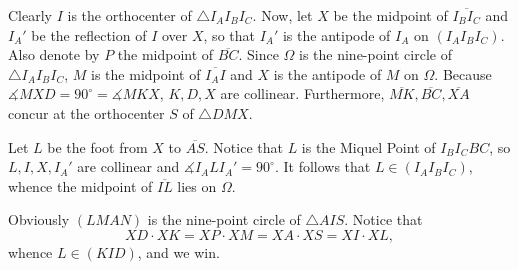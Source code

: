 Clearly $I$ is the orthocenter of $\triangle I_AI_BI_C$. Now, let $X$ be the midpoint of $\overline{I_BI_C}$ and $I_A'$ be the reflection of $I$ over $X$, so that $I_A'$ is the antipode of $I_A$ on $(I_AI_BI_C)$. Also denote by $P$ the midpoint of $\overline{BC}$. Since $\Omega$ is the nine-point circle of $\triangle I_AI_BI_C$, $M$ is the midpoint of $\overline{I_AI}$ and $X$ is the antipode of $M$ on $\Omega$. Because $\measuredangle MXD=90^\circ=\measuredangle MKX$, $K,D,X$ are collinear. Furthermore, $\overline{MK},\overline{BC},\overline{XA}$ concur at the orthocenter $S$ of $\triangle DMX$.

Let $L$ be the foot from $X$ to $\overline{AS}$. Notice that $L$ is the Miquel Point of $I_BI_CBC$, so $L,I,X,I_A'$ are collinear and $\measuredangle I_ALI_A'=90^\circ$. It follows that $L\in(I_AI_BI_C)$, whence the midpoint of $\overline{IL}$ lies on $\Omega$.

Obviously $(LMAN)$ is the nine-point circle of $\triangle AIS$. Notice that \[XD\cdot XK=XP\cdot XM=XA\cdot XS=XI\cdot XL,\]
whence $L\in(KID)$, and we win. 

